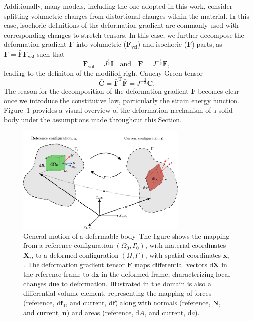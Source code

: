\documentclass[a4paper,11pt]{article}
\begin{document}
Additionally, many models, including the one adopted in this work, consider splitting volumetric changes from distortional changes within the material. In this case, isochoric deﬁnitions of the deformation gradient are commonly used with corresponding changes to stretch tensors. In this case, we further decompose the deformation gradient $\mathbf{F}$ into volumetric ($\mathbf{F}_{\text{vol}}$) and isochoric ($\bar{\mathbf{F}}$) parts, as $\mathbf{F}=\bar{\mathbf{F}}\mathbf{F}_{\text{vol}}$ such that
\begin{equation}
\label{fdecomp}
\mathbf{F}_{\text{vol}}=J^{\frac{1}{3}}\mathbf{I} \quad \text{and} \quad \bar{\mathbf{F}}=J^{-\frac{1}{3}}\mathbf{F},
\end{equation}
leading to the definiton of the modified right Cauchy-Green tensor
\begin{equation}
\label{mrcgt}
\bar{\mathbf{C}}=\bar{\mathbf{F}}^\mathrm{T} \bar{\mathbf{F}}=J^{-\frac{2}{3}}\mathbf{C}.
\end{equation}
The reason for the decomposition of the deformation gradient $\mathbf{F}$ becomes clear once we introduce the constitutive law, particularly the strain energy function. Figure~\ref{fig:kinematics} provides a visual overview of the deformation mechanism of a solid body under the assumptions made throughout this Section.


\begin{figure}[H]
\centering
\includegraphics[width=0.75\textwidth]{images/kinematics.pdf}
\caption{General motion of a deformable body. The figure shows the mapping from a reference configuration $(\Omega_0, \Gamma_0)$, with material coordinates $\mathbf{X}_i$, to a deformed configuration $(\Omega, \Gamma)$, with spatial coordinates $\mathbf{x}_i$. The deformation gradient tensor $\mathbf{F}$ maps differential vectors $\mathrm{d}\mathbf{X}$ in the reference frame to $\mathrm{d}\mathbf{x}$ in the deformed frame, characterizing local changes due to deformation. Illustrated in the domain is also a differential volume element, representing the mapping of forces (reference, $\text{d}\mathbf{f}_0$, and current, $\text{d}\mathbf{f}$) along with normals (reference, $\mathbf{N}$, and current, $\mathbf{n}$) and areas (reference, $\text{d}A$, and current, $\text{d}a$).}
\label{fig:kinematics}
\end{figure}
\end{document}
